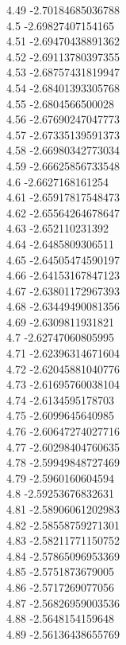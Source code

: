 {4.49	-2.70184685036788\\
4.5	-2.69827407154165\\
4.51	-2.69470438891362\\
4.52	-2.69113780397355\\
4.53	-2.68757431819947\\
4.54	-2.68401393305768\\
4.55	-2.6804566500028\\
4.56	-2.67690247047773\\
4.57	-2.67335139591373\\
4.58	-2.66980342773034\\
4.59	-2.66625856733548\\
4.6	-2.6627168161254\\
4.61	-2.65917817548473\\
4.62	-2.65564264678647\\
4.63	-2.652110231392\\
4.64	-2.6485809306511\\
4.65	-2.64505474590197\\
4.66	-2.64153167847123\\
4.67	-2.63801172967393\\
4.68	-2.63449490081356\\
4.69	-2.6309811931821\\
4.7	-2.62747060805995\\
4.71	-2.62396314671604\\
4.72	-2.62045881040776\\
4.73	-2.61695760038104\\
4.74	-2.6134595178703\\
4.75	-2.6099645640985\\
4.76	-2.60647274027716\\
4.77	-2.60298404760635\\
4.78	-2.59949848727469\\
4.79	-2.5960160604594\\
4.8	-2.59253676832631\\
4.81	-2.58906061202983\\
4.82	-2.58558759271301\\
4.83	-2.58211771150752\\
4.84	-2.57865096953369\\
4.85	-2.5751873679005\\
4.86	-2.5717269077056\\
4.87	-2.56826959003536\\
4.88	-2.5648154159648\\
4.89	-2.56136438655769\\
}
